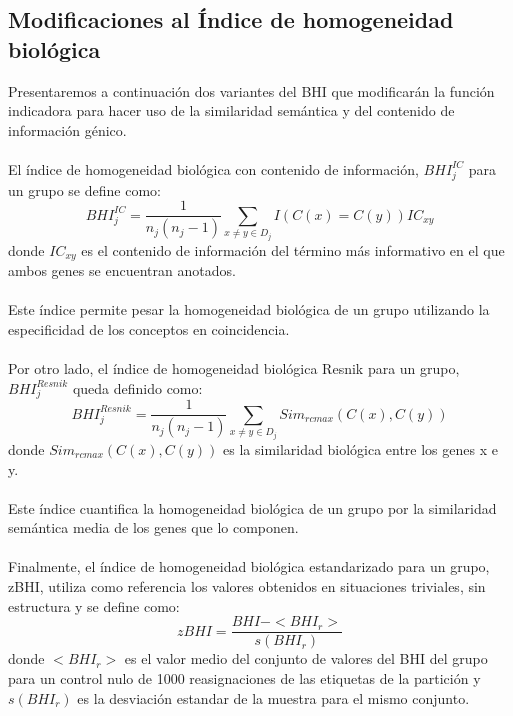 \subsection{Modificaciones al Índice de homogeneidad biológica}
\label{subsec:control_nulo}
Presentaremos a continuación dos variantes del BHI que modificarán la función indicadora para hacer uso de la similaridad semántica y del contenido de información génico.\\\\
El índice de homogeneidad biológica con contenido de información, $BHI_j^{IC}$ para un grupo se define como:
\begin{equation}
	BHI_j^{IC} = \frac{1}{n_j(n_j-1)}\sum\limits_{x\neq y\in D_j}I(C(x)=C(y))IC_{xy}
\end{equation}
donde $IC_{xy}$ es el contenido de información del término más informativo en el que ambos genes se encuentran anotados.\\\\
Este índice permite pesar la homogeneidad biológica de un grupo utilizando la especificidad de los conceptos en coincidencia.\\\\
Por otro lado, el índice de homogeneidad biológica Resnik para un grupo, $BHI_j^{Resnik}$ queda definido como:
\begin{equation}
	BHI_j^{Resnik} = \frac{1}{n_j(n_j-1)}\sum\limits_{x\neq y\in D_j}Sim_{rcmax}(C(x), C(y))
\end{equation}
donde $Sim_{rcmax}(C(x), C(y))$ es la similaridad biológica entre los genes x e y.\\\\
Este índice cuantifica la homogeneidad biológica de un grupo por la similaridad semántica media de los genes que lo componen.\\\\
Finalmente, el índice de homogeneidad biológica estandarizado para un grupo, zBHI, utiliza como referencia los valores obtenidos en situaciones triviales, sin estructura y se define como:
\begin{equation}
	zBHI = \frac{BHI-<BHI_r>}{s(BHI_r)}
\end{equation}
donde $<BHI_r>$ es el valor medio del conjunto de valores del BHI del grupo para un control nulo de 1000 reasignaciones de las etiquetas de la partición y $s(BHI_r)$ es la desviación estandar de la muestra para el mismo conjunto.\\\\
